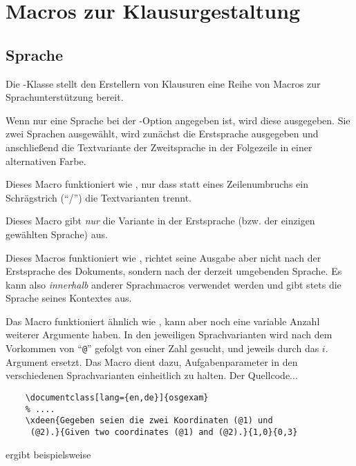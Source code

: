 \documentclass[
load=osgexam,
babel=ngerman
]{skdoc}
\begin{document}
\section{Macros zur Klausurgestaltung}
\subsection{Sprache}
\label{sec:macro:lang}
Die \thepkg-Klasse stellt den Erstellern von Klausuren eine Reihe von Macros zur Sprachunterstützung bereit.

\DescribeMacro{} Wenn nur eine Sprache bei der
-Option angegeben ist, wird diese ausgegeben. Sie zwei Sprachen ausgewählt, wird zunächst die Erstsprache
ausgegeben und anschließend die Textvariante der Zweitsprache in der Folgezeile in einer alternativen Farbe.
\medskip

\DescribeMacro{}Dieses Macro funktioniert wie
, nur dass statt eines Zeilenumbruchs ein Schrägstrich (``/'') die Textvarianten trennt.
\medskip

\DescribeMacro{}Dieses Macro gibt \emph{nur} die
Variante in der Erstsprache (bzw. der einzigen gewählten Sprache) aus.
\medskip

\DescribeMacro{}Dieses Macros funktioniert wie
, richtet seine Ausgabe aber nicht nach der Erstsprache des Dokuments, sondern nach der derzeit umgebenden
Sprache. Es kann also \emph{innerhalb} anderer Sprachmacros verwendet werden und gibt stets die Sprache seines Kontextes
aus.
\medskip

\DescribeMacro{} %
  Das Macro  funktioniert ähnlich wie , kann aber noch eine variable Anzahl weiterer Argumente
  haben. In den jeweiligen Sprachvarianten wird nach dem Vorkommen von ``\verb!@!'' gefolgt von einer Zahl 
  gesucht, und jeweils durch das $i$. Argument ersetzt. Das Macro dient dazu, Aufgabenparameter in den verschiedenen
  Sprachvarianten einheitlich zu halten.
  Der Quellcode...
  \begin{lstlisting}
    \documentclass[lang={en,de}]{osgexam}
    % ....
    \xdeen{Gegeben seien die zwei Koordinaten (@1) und
     (@2).}{Given two coordinates (@1) and (@2).}{1,0}{0,3}
  \end{lstlisting}
\noindent  ergibt beispielsweise
\end{document}
